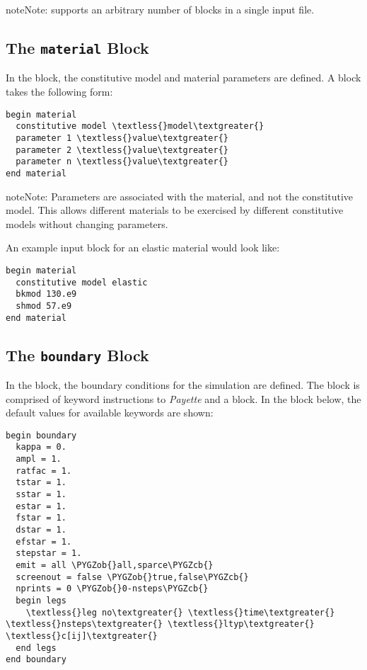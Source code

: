 \documentclass[letterpaper,10pt,english]{sphinxmanual}
\def\PYGZob{\char`\{}
\def\PYGZcb{\char`\}}
\begin{document}
\begin{notice}{note}{Note:}
 supports an arbitrary number of  blocks in a
single input file.
\end{notice}


\subsection{The \texttt{material} Block}
\label{Files/input_file_formatting:material-block}\label{Files/input_file_formatting:the-material-block}
In the  block, the constitutive model and material parameters are
defined. A  block takes the following form:

\begin{Verbatim}[commandchars=\\\{\}]
begin material
  constitutive model \textless{}model\textgreater{}
  parameter 1 \textless{}value\textgreater{}
  parameter 2 \textless{}value\textgreater{}
  parameter n \textless{}value\textgreater{}
end material
\end{Verbatim}

\begin{notice}{note}{Note:}
Parameters are associated with the material, and not the constitutive model.
This allows different materials to be exercised by different constitutive
models without changing parameters.
\end{notice}

An example  input block for an elastic material would look like:

\begin{Verbatim}[commandchars=\\\{\}]
begin material
  constitutive model elastic
  bkmod 130.e9
  shmod 57.e9
end material
\end{Verbatim}


\subsection{The \texttt{boundary} Block}
\label{Files/input_file_formatting:the-boundary-block}\label{Files/input_file_formatting:boundary-block}
In the  block, the boundary conditions for the simulation are
defined. The  block is comprised of keyword instructions to
\emph{Payette} and a  block. In the  block below, the default
values for available keywords are shown:

\begin{Verbatim}[commandchars=\\\{\}]
begin boundary
  kappa = 0.
  ampl = 1.
  ratfac = 1.
  tstar = 1.
  sstar = 1.
  estar = 1.
  fstar = 1.
  dstar = 1.
  efstar = 1.
  stepstar = 1.
  emit = all \PYGZob{}all,sparce\PYGZcb{}
  screenout = false \PYGZob{}true,false\PYGZcb{}
  nprints = 0 \PYGZob{}0-nsteps\PYGZcb{}
  begin legs
    \textless{}leg no\textgreater{} \textless{}time\textgreater{} \textless{}nsteps\textgreater{} \textless{}ltyp\textgreater{}  \textless{}c[ij]\textgreater{}
  end legs
end boundary
\end{Verbatim}
\end{document}
